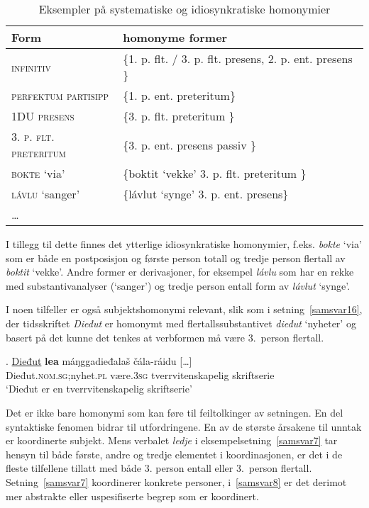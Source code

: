 \documentclass{flammie}
\begin{document}
\begin{table}[htb]
    \centering
    \small
    \begin{tabular}{l|l}
         \textbf{Form} & \textbf{homonyme former} \\
         \hline
         \textsc{infinitiv} & \{1. p. flt. / 3. p. flt. presens, 2. p. ent. presens \} \\
         \textsc{perfektum partisipp} & \{1. p. ent. preteritum\} \\
         \textsc{1DU presens} & \{3. p. flt. preteritum \} \\
         \textsc{3. p. flt. preteritum} & \{3. p. ent. presens passiv \} \\
         \hline
         \hline
         \textsc{bokte} `via' & \{boktit `vekke' 3. p. flt. preteritum \} \\
         \textsc{lávlu} `sanger' & \{lávlut `synge' 3. p. ent. presens\} \\
         \textsc{\ldots} & \\
         \end{tabular}
    \caption{Eksempler på systematiske og idiosynkratiske homonymier\label{systematiskhomonymi}}
\end{table}


I tillegg til dette finnes det ytterlige idiosynkratiske homonymier, f.eks.
\textit{bokte} `via' som er både en postposisjon og første person totall og
tredje person flertall av \textit{boktit} `vekke'.  Andre former er
derivasjoner, for eksempel \textit{lávlu} som har en rekke med
substantivanalyser (`sanger') og tredje person entall form av \textit{lávlut}
`synge'.

I noen tilfeller er også subjektshomonymi relevant, slik som i
setning~\ref{samsvar16}, der tidsskriftet \textit{Dieđut} er homonymt med
flertallssubstantivet \textit{dieđut} `nyheter' og basert på det kunne det
tenkes at verbformen må være 3.\ person flertall.

\exg. \underline{Dieđut} \textbf{lea} máŋggadieđalaš čála-ráidu [\ldots]\label{samsvar16}\\
Dieđut\textsc{.nom.sg};nyhet\textsc{.pl} være\textsc{.3sg} tverrvitenskapelig skriftserie \\
`Dieđut {er} en tverrvitenskapelig skriftserie'

Det er ikke bare homonymi som kan føre til feiltolkinger av setningen. En del
syntaktiske fenomen bidrar til utfordringene. En av de største årsakene til
unntak er koordinerte subjekt. Mens verbalet \textit{ledje} i
eksempelsetning~\ref{samsvar7} tar hensyn til både første, andre og tredje
elementet i koordinasjonen, er det i de fleste tilfellene tillatt med både 3.
person entall eller 3.\ person flertall.  Setning~\ref{samsvar7} koordinerer
konkrete personer, i~\ref{samsvar8} er det derimot mer abstrakte eller
uspesifiserte begrep som er koordinert.
\end{document}
